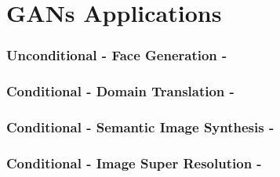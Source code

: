 \documentclass{beamer}
\begin{document}
\section{GANs Applications}

{
	\begin{frame}
		\frametitle{Unconditional - Face Generation - \cite{karrasProgressiveGrowingGANs2017}}
	\end{frame}
}

{
	\begin{frame}
		\frametitle{Conditional - Domain Translation - \cite{isolaImagetoImageTranslationConditional2016a}}
	\end{frame}
}


	\begin{frame}
		\frametitle{Conditional - Semantic Image Synthesis - \cite{parkSemanticImageSynthesis2019}}
	\end{frame}


{
	\begin{frame}
		\frametitle{Conditional - Image Super Resolution - \cite{ledigPhotoRealisticSingleImage2016}}
	\end{frame}
}
\end{document}
